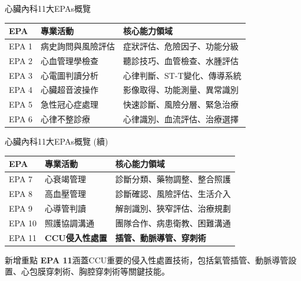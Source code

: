 \documentclass[aspectratio=169]{beamer}
\begin{document}
\begin{frame}{心臟內科11大EPAs概覽}
\footnotesize
\begin{table}
\centering
\begin{tabular}{|p{1cm}|p{4cm}|p{6cm}|}
\hline
\rowcolor{emergency_blue!20}
\textbf{EPA} & \textbf{專業活動} & \textbf{核心能力領域} \\
\hline
EPA 1 & 病史詢問與風險評估 & 症狀評估、危險因子、功能分級 \\
\hline
EPA 2 & 心血管理學檢查 & 聽診技巧、血管檢查、水腫評估 \\
\hline
EPA 3 & 心電圖判讀分析 & 心律判斷、ST-T變化、傳導系統 \\
\hline
EPA 4 & 心臟超音波操作 & 影像取得、功能測量、異常識別 \\
\hline
EPA 5 & 急性冠心症處理 & 快速診斷、風險分層、緊急治療 \\
\hline
EPA 6 & 心律不整診療 & 心律識別、血流評估、治療選擇 \\
\hline
\end{tabular}
\end{table}
\end{frame}

\begin{frame}{心臟內科11大EPAs概覽 (續)}
\footnotesize
\begin{table}
\centering
\begin{tabular}{|p{1cm}|p{4cm}|p{6cm}|}
\hline
\rowcolor{emergency_blue!20}
\textbf{EPA} & \textbf{專業活動} & \textbf{核心能力領域} \\
\hline
EPA 7 & 心衰竭管理 & 診斷分類、藥物調整、整合照護 \\
\hline
EPA 8 & 高血壓管理 & 診斷確認、風險評估、生活介入 \\
\hline
EPA 9 & 心導管判讀 & 解剖識別、狹窄評估、治療規劃 \\
\hline
EPA 10 & 照護協調溝通 & 團隊合作、病患衛教、困難溝通 \\
\hline
\rowcolor{emergency_red!10}
EPA 11 & \textcolor{emergency_red}{\textbf{CCU侵入性處置}} & \textcolor{emergency_red}{\textbf{插管、動脈導管、穿刺術}} \\
\hline
\end{tabular}
\end{table}

\vspace{0.3cm}
\begin{alertblock}{新增重點}
\textbf{EPA 11}涵蓋CCU重要的侵入性處置技術，包括氣管插管、動脈導管設置、心包膜穿刺術、胸腔穿刺術等關鍵技能。
\end{alertblock}
\end{frame}
\end{document}
